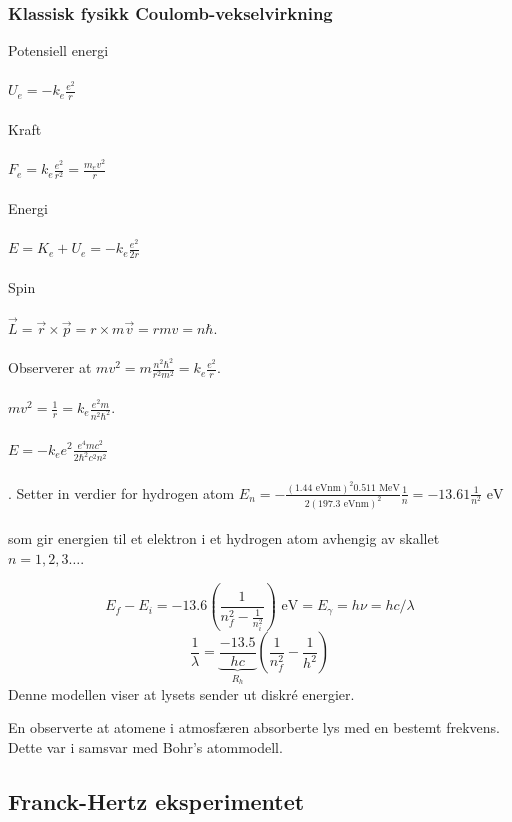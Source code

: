 \subsubsection{Klassisk fysikk Coulomb-vekselvirkning}
Potensiell energi \\\\ 
$\displaystyle U_e = -k_e \frac{e^{2}}{r}$ \\\\
Kraft \\\\
$\displaystyle F_e = k_e \frac{e^{2}}{r^{2}} = \frac{m_e v^{2}}{r}$\\\\
Energi \\\\
$\displaystyle E = K_e + U_e = - k_e \frac{e^{2}}{2r}$\\\\ 
Spin \\\\
$\displaystyle \vec{L} = \vec{r} × \vec{p} = r × m \vec{v} = rmv = nℏ $. \\\\
Observerer at $\displaystyle  mv^{2} = m \frac{n^{2}ℏ^{2}}{r^{2} m^{2}} = k_e \frac{e^{2}}{r}$.\\\\
$\displaystyle mv^{2} = \frac{1}{r} = k_e \frac{e^{2}m}{n^{2}ℏ^{2}}$. \\\\
$\displaystyle E = -k_e e^{2} \frac{e^{4} mc^{2}}{2 ℏ^2 c^2 n^2}$\\\\.
Setter in verdier for hydrogen atom
$\displaystyle E_n = -\frac{\left( 1.44 \text{ eVnm} \right) ^{2} 0.511 \text{ MeV}}{2\left( 197.3 \text{ eVnm} \right)^2 } \frac{1}{n} = -13.61 \frac{1}{n^2} \text{ eV}$\\\\ som gir energien til et elektron i et hydrogen atom avhengig av skallet $n = 1, 2, 3\ldots$.   

\[
E_f - E_i = - 13.6 \left( \frac{1}{n^2 _{f} - \frac{1}{n_i^2}} \right) \text{ eV} = E_{γ} = hν = hc/λ
\]
\[
\frac{1}{λ} = \underbrace{\frac{-13.5}{hc}}_{R_h} \left( \frac{1}{n_f ^2} - \frac{1}{h^2} \right) 
\]
Denne modellen viser at lysets sender ut diskré energier. 

En observerte at atomene i atmosfæren absorberte lys med en bestemt frekvens. Dette var i samsvar med Bohr's atommodell.


\subsection{Franck-Hertz eksperimentet}

